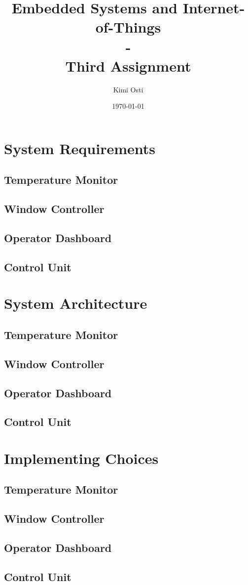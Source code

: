 \documentclass[a4paper,12pt]{report}
\title{Embedded Systems and Internet-of-Things \\ - \\ Third Assignment}
\author{Kimi Osti}
\date{\today}
\begin{document}
	
	\maketitle
	\tableofcontents
	
	\chapter{System Requirements}
	\section{Temperature Monitor}
	\section{Window Controller}
	\section{Operator Dashboard}
	\section{Control Unit}
	
	\chapter{System Architecture}
	\section{Temperature Monitor}
	\section{Window Controller}
	\section{Operator Dashboard}
	\section{Control Unit}
	
	\chapter{Implementing Choices}
	\section{Temperature Monitor}
	\section{Window Controller}
	\section{Operator Dashboard}
	\section{Control Unit}
	
\end{document}
